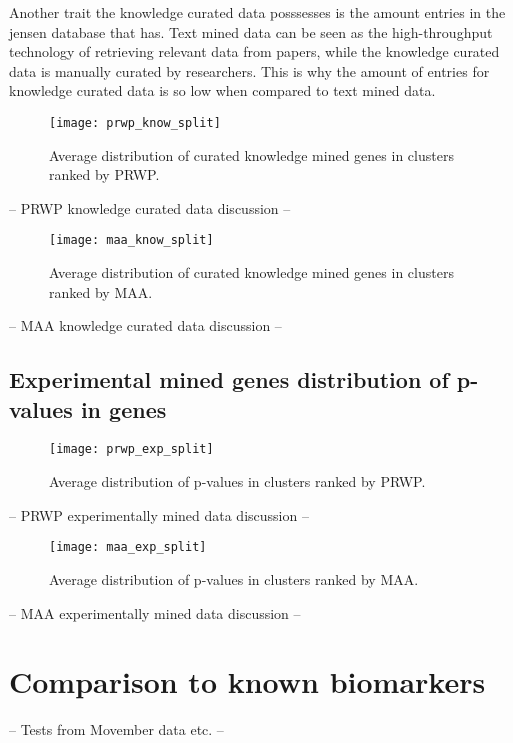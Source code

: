 Another trait the knowledge curated data posssesses is the amount entries in the
\gls{jensen} database that has. Text mined data can be seen as the
high-throughput technology of retrieving relevant data from papers, while the
knowledge curated data is manually curated by researchers. This is why the
amount of entries for knowledge curated data is so low when compared to text
mined data.

\begin{figure}[H]
    \label{fig:know-iref-prwp}
    \texttt{[image: prwp\_know\_split]}
    \caption{Average distribution of curated knowledge mined genes in clusters
    ranked by PRWP.}
\end{figure}
-- PRWP knowledge curated data discussion --

\begin{figure}[H]
    \label{fig:know-iref-maa}
    \texttt{[image: maa\_know\_split]}
    \caption{Average distribution of curated knowledge mined genes in clusters
    ranked by MAA.}
\end{figure}
-- MAA knowledge curated data discussion --

\subsection{Experimental mined genes distribution of p-values in genes}
\begin{figure}[H]
    \label{fig:exp-iref-prwp}
    \texttt{[image: prwp\_exp\_split]}
    \caption{Average distribution of p-values in clusters ranked by PRWP.}
\end{figure}
-- PRWP experimentally mined data discussion --

\begin{figure}[H]
    \label{fig:exp-iref-maa}
    \texttt{[image: maa\_exp\_split]}
    \caption{Average distribution of p-values in clusters ranked by MAA.}
\end{figure}
-- MAA experimentally mined data discussion --


\section{Comparison to known biomarkers}
-- Tests from Movember data etc. --

